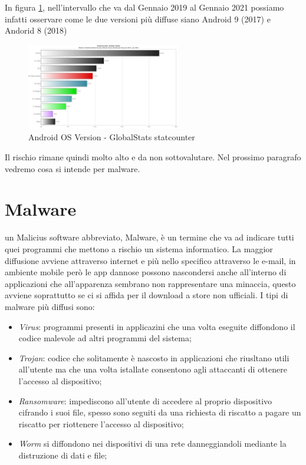 In figura \ref{fig:os version}, nell'intervallo che va dal Gennaio 2019 al Gennaio 2021 possiamo infatti osservare come le due versioni più diffuse siano Android 9 (2017) e Andorid 8 (2018) 

    \begin{figure}[h]
        \centering
        \includegraphics[width=0.6\textwidth]{imgs/capitolo3/StatCounter-android_version-ww-monthly-201901-202101-bar.png}
        \caption{Android OS Version - GlobalStats statcounter}
        \label{fig:os version}
        \end{figure}
        \FloatBarrier %


Il rischio rimane quindi molto alto e da non sottovalutare. 
Nel prossimo paragrafo vedremo cosa si intende per malware. 
\section{Malware}
un Malicius software abbreviato, Malware, è un termine che va ad indicare tutti quei programmi che mettono a rischio un sistema informatico. La maggior diffusione avviene attraverso internet e più nello specifico attraverso le e-mail, in ambiente mobile però le app dannose possono nascondersi anche all'interno di applicazioni che all'apparenza sembrano non rappresentare una minaccia, questo avviene soprattutto se ci si affida per il download a store non ufficiali. I tipi di malware più diffusi sono: 
\begin{itemize}
    \item \textit{Virus}: programmi presenti in applicazini che una volta eseguite diffondono il codice malevole ad altri programmi del sistema;
    \item \textit{Trojan}: codice che solitamente è nascosto in applicazioni che riusltano utili all'utente ma che una volta istallate consentono agli attaccanti di ottenere l'accesso al dispositivo; 
    \item \textit{Ransomware}: impediscono all'utente di accedere al proprio dispositivo cifrando i suoi file, spesso sono seguiti da una richiesta di riscatto a pagare un riscatto per riottenere l'accesso al dispositivo; 
    \item \textit{Worm} si diffondono nei dispositivi di una rete danneggiandoli mediante la distruzione di dati e file;
\end{itemize}


